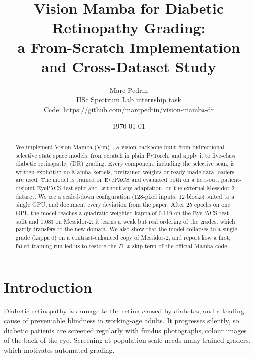 \documentclass[11pt,a4paper]{article}
\title{Vision Mamba for Diabetic Retinopathy Grading:\\
       a From-Scratch Implementation and Cross-Dataset Study}
\author{Marc Pedrin\\IISc Spectrum Lab internship task\\[0.5ex]\small Code: \url{https://github.com/marcpedrin/vision-mamba-dr}}
\date{\today}
\begin{document}
\maketitle

\begin{abstract}
We implement Vision Mamba (Vim)~\cite{zhu2024vim}, a vision backbone built from
bidirectional selective state space models, from scratch in plain PyTorch, and apply
it to five-class diabetic retinopathy (DR) grading. Every component, including the
selective scan, is written explicitly; no Mamba kernels, pretrained weights or
ready-made data loaders are used. The model is trained on EyePACS and evaluated both
on a held-out, patient-disjoint EyePACS test split and, without any adaptation, on
the external Messidor-2 dataset. We use a scaled-down configuration (128-pixel
inputs, 12 blocks) suited to a single GPU, and document every deviation from the
paper. After 25 epochs on one GPU the model reaches a quadratic weighted kappa of
0.119 on the EyePACS test split and 0.083 on Messidor-2: it learns a weak but real
ordering of the grades, which partly transfers to the new domain. We also show that
the model collapses to a single grade (kappa 0) on a contrast-enhanced copy of
Messidor-2, and report how a first, failed training run led us to restore the
$D\cdot x$ skip term of the official Mamba code.
\end{abstract}

\section{Introduction}

Diabetic retinopathy is damage to the retina caused by diabetes, and a leading cause
of preventable blindness in working-age adults. It progresses silently, so
diabetic patients are screened regularly with fundus photographs, colour images of
the back of the eye. Screening at population scale needs many trained graders,
which motivates automated grading.
\end{document}

